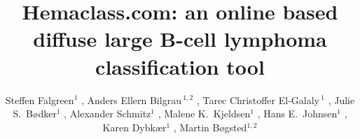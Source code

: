 \documentclass[10pt]{bmc_article}
\newenvironment{bmcformat}{\fussy\setboolean{publ}{true}}{\fussy}
\begin{document}
\begin{bmcformat}
\vspace*{-2.5cm}


\title{Hemaclass.com: an online based diffuse large B-cell lymphoma classification tool}


\author{Steffen Falgreen\correspondingauthor$^1$%
,
Anders Ellern Bilgrau\,$^{1,2}$
,
Tarec Christoffer El-Galaly\,$^{1}$
,
Julie S.\  B\o dker$^{1}$%
,
Alexander Schmitz$^{1}$%
,
Malene K.\ Kjeldsen$^{1}$%
,
Hans E.\ Johnsen$^{1}$%
,
Karen Dybk\ae r$^{1}$%
,
Martin B\o gsted$^{1,2}$%
      }



\address{%
    \iid(1)Department of Haematology, Aalborg University Hospital, Aalborg, Denmark
    \iid(2)Department of Mathematical Sciences, Aalborg University, Aalborg, Denmark
}%

\maketitle


\end{bmcformat}
\end{document}

